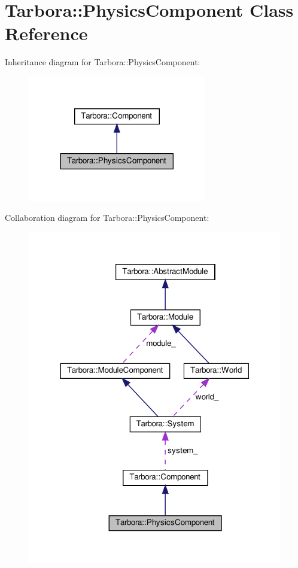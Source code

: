 \hypertarget{classTarbora_1_1PhysicsComponent}{}\section{Tarbora\+:\+:Physics\+Component Class Reference}
\label{classTarbora_1_1PhysicsComponent}


Inheritance diagram for Tarbora\+:\+:Physics\+Component\+:\nopagebreak
\begin{figure}[H]
\begin{center}
\leavevmode
\includegraphics[width=221pt]{classTarbora_1_1PhysicsComponent__inherit__graph}
\end{center}
\end{figure}


Collaboration diagram for Tarbora\+:\+:Physics\+Component\+:\nopagebreak
\begin{figure}[H]
\begin{center}
\leavevmode
\includegraphics[width=316pt]{classTarbora_1_1PhysicsComponent__coll__graph}
\end{center}
\end{figure}

